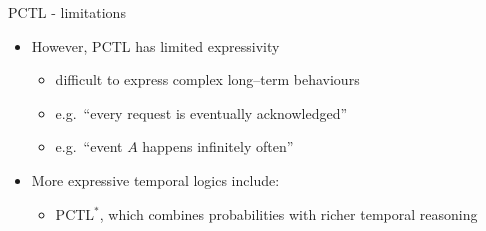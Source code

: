 \documentclass[dvipsnames]{beamer}
\begin{document}
\begin{frame}{PCTL - limitations}

    \begin{itemize}
        \item[]
              However, PCTL has limited expressivity

              \begin{itemize}
                  \item[$-$]
                        difficult to express complex long--term behaviours
                  \item[$-$]
                        e.g.\ ``every request is eventually acknowledged''
                  \item[$-$]
                        e.g.\ ``event $A$ happens infinitely often''
              \end{itemize}

        \item[]
              More expressive temporal logics include:

              \begin{itemize}

                  \item[$-$]
                        PCTL$^{*}$,
                        which combines probabilities with richer temporal reasoning
              \end{itemize}

    \end{itemize}

\end{frame}

\end{document}
